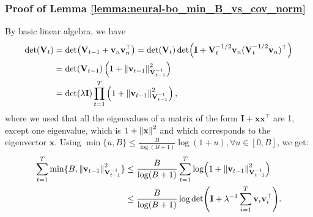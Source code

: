\subsubsection{Proof of Lemma \ref{lemma:neural-bo_min_B_vs_cov_norm}}
\label{section:neural-bo_min_B_vs_cov_norm_proof}


By basic linear algebra, we have 
\begin{equation*}
\begin{split}
    \det (\mathbf{V}_t)  & = \det (\mathbf{V}_{t-1} + \mathbf{v}_n\mathbf{v}_n^\top) = \det(\mathbf{V}_t)\det(\mathbf{I}+\mathbf{V}_t^{-1/2}\mathbf{v}_n(\mathbf{V}_t^{-1/2}\mathbf{v}_n)^\top) \\
  & = \det(\mathbf{V}_{t-1}) \left(1+\norm{\mathbf{v}_{t-1}}^2_{\mathbf{V}_{t-1}^{-1}} \right) \\
  & = \det (\lambda \mathbf{I}) \prod_{t=1}^T \left(1+\norm{\mathbf{v}_{t-1}}^2_{\mathbf{V}_{t-1}^{-1}} \right),
\end{split}
\end{equation*}
where we used that all the eigenvalues of a matrix of the form $\mathbf{I} + \mathbf{x}\mathbf{x}^\top$ are 1, except one eigenvalue, which is $1+\norm{\mathbf{x}}^2$ and which corresponds to the eigenvector $\mathbf{x}$. Using $\min\{u,B\} \leq \frac{B}{\log(B+1)}\log(1+u), \forall u \in [0,B]$, we get: 
\begin{equation*}
    \begin{split}
        \sum_{t=1}^T \min \{B,\norm{\mathbf{v}_{t-1}}^2_{\mathbf{V}_{t-1}^{-1}}\} & \leq \frac{B}{\log(B+1)} \sum_{t=1}^T \log (1+\norm{\mathbf{v}_{t-1}}^2_{\mathbf{V}_{t-1}^{-1}}) \\
        & \leq \frac{B}{\log(B+1)} \log \det (\mathbf{I} + \lambda^{-1}\sum_{i=1}^T \mathbf{v}_i\mathbf{v}_i^\top ).
    \end{split}
\end{equation*}


